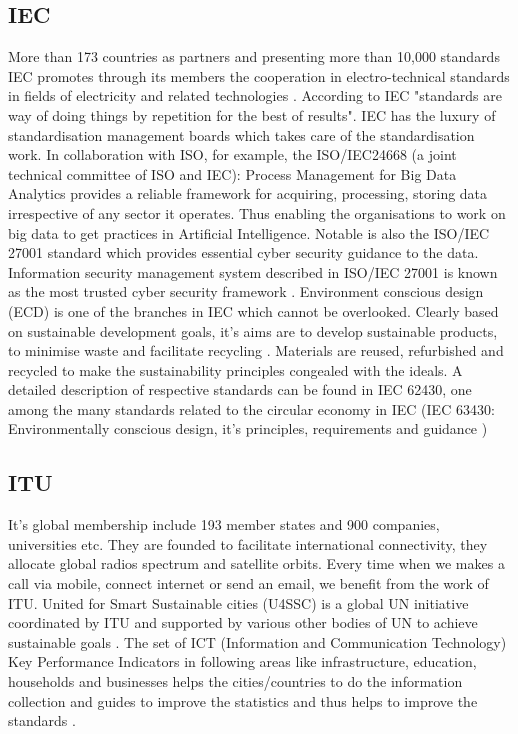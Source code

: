 \documentclass[sigconf]{acmart}
\begin{document}
\subsection{IEC}
More than 173 countries as partners and presenting more than 10,000 standards IEC promotes through its members the cooperation in electro-technical standards in fields of electricity and related technologies \citep{IEC}. According to IEC \cite{IEC} "standards are way of doing things by repetition for the best of results". IEC has the luxury of standardisation management boards which takes care of the standardisation work. In collaboration with ISO, for example, the ISO/IEC24668 (a joint technical committee of ISO and IEC): Process Management for Big Data Analytics provides a reliable framework for acquiring, processing, storing data irrespective of any sector it operates. Thus enabling the organisations to work on big data to get practices in Artificial Intelligence. Notable is also the ISO/IEC 27001 standard which provides essential cyber security guidance to the data. Information security management system described in ISO/IEC 27001 is known as the most trusted cyber security framework \citep{editorial}. Environment conscious design (ECD) is one of the branches in IEC which cannot be overlooked. Clearly based on sustainable development goals, it's aims are to develop sustainable products, to minimise waste and facilitate recycling \citep{editorial}. Materials are reused, refurbished and recycled to make the sustainability principles congealed with the ideals. A detailed description of respective standards can be found in IEC 62430, one among the many standards related to the circular economy in IEC (IEC 63430: Environmentally conscious design, it's principles, requirements and guidance \citep{editorial})


\subsection{ITU}
It's global membership include 193 member states and 900 companies, universities etc. They are founded to facilitate international connectivity, they allocate global radios spectrum and satellite orbits. Every time when we makes a call via mobile, connect internet or send an email, we benefit from the work of ITU.
United for Smart Sustainable cities (U4SSC) is a global UN initiative coordinated by ITU and supported by various other bodies of UN to achieve sustainable goals \citep{ITU}. The set of ICT (Information and Communication Technology) Key Performance Indicators in following areas like infrastructure, education, households and businesses helps the cities/countries to do the information collection and guides to improve the statistics and thus helps to improve the standards \cite{ITU}.
\end{document}
